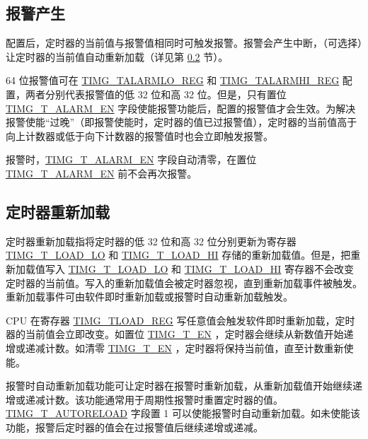 \documentclass[main\_\_CN.tex]{subfiles}
\begin{document}
\subsection{报警产生}
配置后，定时器的当前值与报警值相同时可触发报警。报警会产生中断，（可选择）让定时器的当前值自动重新加载（详见第 \ref{Timer_Reload} 节）。

64 位报警值可在 \hyperref[regdesc:TIMGTXALARMLOREG]{TIMG\_TALARMLO\_REG} 和 \hyperref[regdesc:TIMGTXALARMHIREG]{TIMG\_TALARMHI\_REG} 配置，两者分别代表报警值的低 32 位和高 32 位。但是，只有置位 \hyperref[fielddesc:TIMGTXALARMEN]{TIMG\_T\_ALARM\_EN} 字段使能报警功能后，配置的报警值才会生效。为解决报警使能“过晚”（即报警使能时，定时器的值已过报警值），定时器的当前值高于向上计数器或低于向下计数器的报警值时也会立即触发报警。

报警时，\hyperref[fielddesc:TIMGTXALARMEN]{TIMG\_T\_ALARM\_EN} 字段自动清零，在置位 \hyperref[fielddesc:TIMGTXALARMEN]{TIMG\_T\_ALARM\_EN} 前不会再次报警。

\subsection{定时器重新加载} \label{Timer_Reload}
定时器重新加载指将定时器的低 32 位和高 32 位分别更新为寄存器 \hyperref[fielddesc:TIMGTXLOADLO]{TIMG\_T\_LOAD\_LO} 和 \hyperref[fielddesc:TIMGTXLOADHI]{TIMG\_T\_LOAD\_HI} 存储的重新加载值。但是，把重新加载值写入 \hyperref[fielddesc:TIMGTXLOADLO]{TIMG\_T\_LOAD\_LO} 和 \hyperref[fielddesc:TIMGTXLOADHI]{TIMG\_T\_LOAD\_HI} 寄存器不会改变定时器的当前值。写入的重新加载值会被定时器忽视，直到重新加载事件被触发。重新加载事件可由软件即时重新加载或报警时自动重新加载触发。

CPU 在寄存器 \hyperref[regdesc:TIMGTXLOADREG]{TIMG\_TLOAD\_REG} 写任意值会触发软件即时重新加载，定时器的当前值会立即改变。如置位 \hyperref[fielddesc:TIMGTXEN]{TIMG\_T\_EN} ，定时器会继续从新数值开始递增或递减计数。如清零 \hyperref[fielddesc:TIMGTXEN]{TIMG\_T\_EN} ，定时器将保持当前值，直至计数重新使能。

报警时自动重新加载功能可让定时器在报警时重新加载，从重新加载值开始继续递增或递减计数。该功能通常用于周期性报警时重置定时器的值。\hyperref[fielddesc:TIMGTXAUTORELOAD]{TIMG\_T\_AUTORELOAD} 字段置 1 可以使能报警时自动重新加载。如未使能该功能，报警后定时器的值会在过报警值后继续递增或递减。
\end{document}
